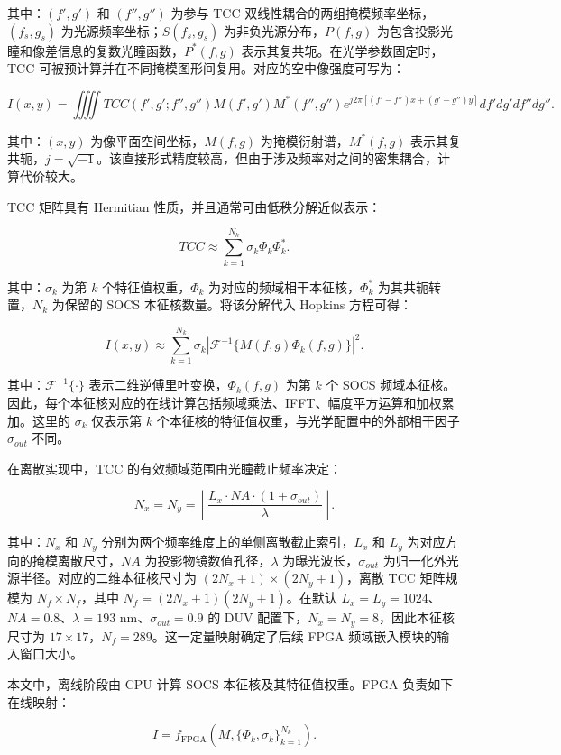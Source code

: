\documentclass[
  preprint]{elsarticle}
\begin{document}
其中：\((f',g')\) 和 \((f'',g'')\) 为参与 TCC
双线性耦合的两组掩模频率坐标，\((f_s,g_s)\)
为光源频率坐标；\(S(f_s,g_s)\) 为非负光源分布，\(P(f,g)\)
为包含投影光瞳和像差信息的复数光瞳函数，\(P^*(f,g)\)
表示其复共轭。在光学参数固定时，TCC
可被预计算并在不同掩模图形间复用。对应的空中像强度可写为：

\[
I(x,y)=
\iiiint TCC(f',g';f'',g'')M(f',g')M^*(f'',g'')
e^{j2\pi[(f'-f'')x+(g'-g'')y]}df'dg'df''dg''.
\tag{2}
\]

其中：\((x,y)\) 为像平面空间坐标，\(M(f,g)\) 为掩模衍射谱，\(M^*(f,g)\)
表示其复共轭，\(j=\sqrt{-1}\)。该直接形式精度较高，但由于涉及频率对之间的密集耦合，计算代价较大。

TCC 矩阵具有 Hermitian 性质，并且通常可由低秩分解近似表示：

\[
TCC \approx \sum_{k=1}^{N_k}\sigma_k\Phi_k\Phi_k^*.
\tag{3}
\]

其中：\(\sigma_k\) 为第 \(k\) 个特征值权重，\(\Phi_k\)
为对应的频域相干本征核，\(\Phi_k^*\) 为其共轭转置，\(N_k\) 为保留的 SOCS
本征核数量。将该分解代入 Hopkins 方程可得：

\[
I(x,y) \approx
\sum_{k=1}^{N_k}\sigma_k
\left|\mathcal{F}^{-1}\{M(f,g)\Phi_k(f,g)\}\right|^2.
\tag{4}
\]

其中：\(\mathcal{F}^{-1}\{\cdot\}\)
表示二维逆傅里叶变换，\(\Phi_k(f,g)\) 为第 \(k\) 个 SOCS
频域本征核。因此，每个本征核对应的在线计算包括频域乘法、IFFT、幅度平方运算和加权累加。这里的
\(\sigma_k\) 仅表示第 \(k\)
个本征核的特征值权重，与光学配置中的外部相干因子 \(\sigma_{out}\) 不同。

在离散实现中，TCC 的有效频域范围由光瞳截止频率决定：

\[
N_x=N_y=\left\lfloor \frac{L_x\cdot NA\cdot(1+\sigma_{out})}{\lambda}\right\rfloor .
\tag{5}
\]

其中：\(N_x\) 和 \(N_y\) 分别为两个频率维度上的单侧离散截止索引，\(L_x\)
和 \(L_y\) 为对应方向的掩模离散尺寸，\(NA\)
为投影物镜数值孔径，\(\lambda\) 为曝光波长，\(\sigma_{out}\)
为归一化外光源半径。对应的二维本征核尺寸为
\((2N_x+1)\times(2N_y+1)\)，离散 TCC 矩阵规模为 \(N_f\times N_f\)，其中
\(N_f=(2N_x+1)(2N_y+1)\)。在默认
\(L_x=L_y=1024\)、\(NA=0.8\)、\(\lambda=193\) nm、\(\sigma_{out}=0.9\)
的 DUV 配置下，\(N_x=N_y=8\)，因此本征核尺寸为
\(17 \times 17\)，\(N_f=289\)。这一定量映射确定了后续 FPGA
频域嵌入模块的输入窗口大小。

本文中，离线阶段由 CPU 计算 SOCS 本征核及其特征值权重。FPGA
负责如下在线映射：

\[
\hat{I}=f_{\mathrm{FPGA}}(M,\{\Phi_k,\sigma_k\}_{k=1}^{N_k}).
\tag{6}
\]
\end{document}

